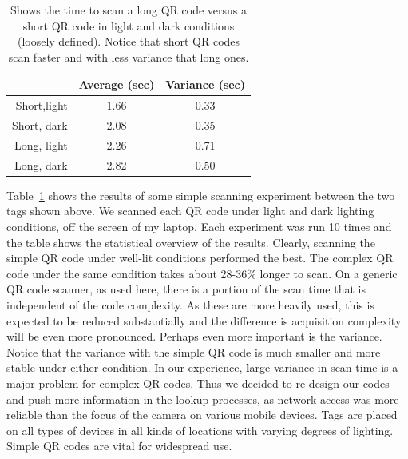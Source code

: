 
\begin{table}
\label{tab:qrscans}
\begin{center}
  \begin{tabular}{| r | c  c | }
    \hline
    			 & {\textbf Average (sec) } & {\textbf Variance (sec)} \\ \hline
    Short,light & 1.66 & 0.33 \\ \hline
    Short, dark & 2.08 & 0.35 \\ \hline
    Long, light & 2.26 & 0.71 \\ \hline
    Long, dark & 2.82 & 0.50 \\
    \hline
  \end{tabular}
\caption{Shows the time to scan a long QR code versus a short QR code in light and dark conditions (loosely defined).
Notice that short QR codes scan faster and with less variance that long ones.}
\end{center}

\end{table}

Table~\ref{tab:qrscans} shows the results of some simple scanning experiment between the two tags
shown above.  We scanned each QR code under light and dark lighting conditions, off the screen of my laptop.
Each experiment was run 10 times and the table shows the statistical
overview of the results. 
Clearly, scanning the simple QR code under well-lit conditions
performed the best.  The complex QR code under the same condition takes about 28-36\% longer to scan.
On a generic QR code scanner, as used here, there is a portion of the
scan time that is independent of the code complexity.  As these are
more heavily used, this is expected to be reduced substantially and
the difference is acquisition complexity will be even more pronounced.
Perhaps even more important is the variance.  Notice that the variance with the simple QR code is much smaller and
more stable under either condition.  In our experience, {\textbf large variance in scan time is a major
problem for complex QR codes}.  Thus we decided to re-design our codes and push more information in the lookup
processes, as network access was more reliable than the focus of the camera on various mobile devices.
Tags are placed on all types of devices in all kinds of locations with varying degrees of lighting.
Simple QR codes are vital for widespread use.

